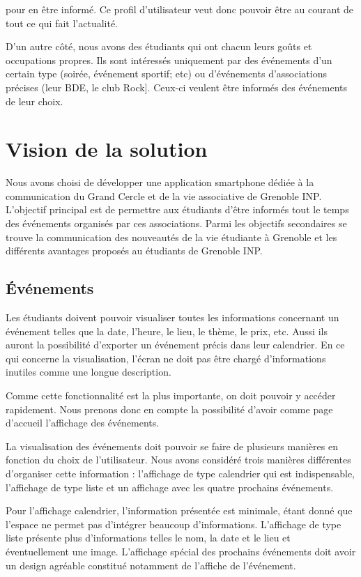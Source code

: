 \documentclass[a4paper, 11px]{article}
\begin{document}
pour en être informé. Ce profil d'utilisateur veut donc pouvoir être au courant de tout ce qui fait l'actualité.

D'un autre côté, nous avons des étudiants qui ont chacun leurs goûts et occupations propres. Ils sont intéressés uniquement par des événements d'un certain type (soirée, événement sportif; etc) ou d'événements d'associations précises (leur BDE, le club Rock]. Ceux-ci veulent être informés des événements de leur choix.

\newpage

\section{Vision de la solution}

Nous avons choisi de développer une application smartphone dédiée à la communication du Grand Cercle et de la vie associative de Grenoble INP. L'objectif principal est de permettre aux étudiants d'être informés tout le temps des événements organisés par ces associations. Parmi les objectifs secondaires se trouve la communication des nouveautés de la vie étudiante à Grenoble et les différents avantages proposés au étudiants de Grenoble INP.

\subsection{Événements}

Les étudiants doivent pouvoir visualiser toutes les informations concernant un événement telles que la date, l'heure, le lieu, le thème, le prix, etc. Aussi ils auront la possibilité d'exporter un événement précis dans leur calendrier. En ce qui concerne la visualisation, l'écran ne doit pas être chargé d'informations inutiles comme une longue description.

Comme cette fonctionnalité est la plus importante, on doit pouvoir y accéder rapidement. Nous prenons donc en compte la possibilité d'avoir comme page d'accueil l'affichage des événements.

La visualisation des événements doit pouvoir se faire de plusieurs manières en fonction du choix de l'utilisateur. Nous avons considéré trois manières différentes d'organiser cette information : l'affichage de type calendrier qui est indispensable, l'affichage de type liste et un affichage avec les quatre prochains événements.

Pour l'affichage calendrier, l'information présentée est minimale, étant donné que l'espace ne permet pas d'intégrer beaucoup d'informations. L'affichage de type liste présente plus d'informations telles le nom, la date et le lieu et éventuellement une image. L'affichage spécial des prochains événements doit avoir un design agréable constitué notamment de l'affiche de l'événement.
\end{document}
